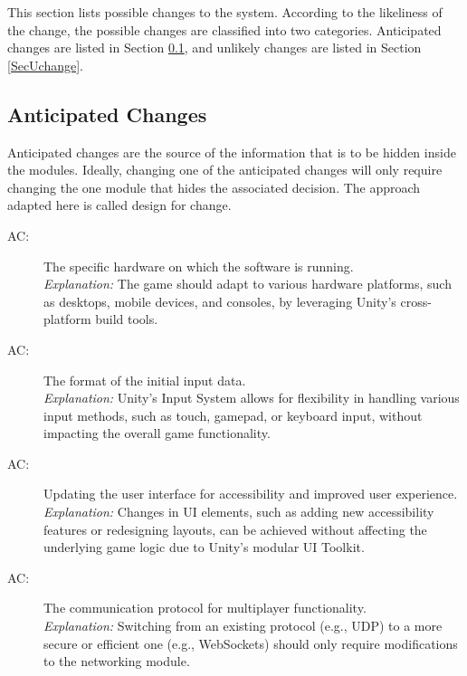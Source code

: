 \documentclass[12pt, titlepage]{article}
\newcounter{acnum}
\newcommand{\actheacnum}{AC\theacnum}
\begin{document}
This section lists possible changes to the system. According to the likeliness
of the change, the possible changes are classified into two
categories. Anticipated changes are listed in Section \ref{SecAchange}, and
unlikely changes are listed in Section \ref{SecUchange}.

\subsection{Anticipated Changes} \label{SecAchange}

Anticipated changes are the source of the information that is to be hidden
inside the modules. Ideally, changing one of the anticipated changes will only
require changing the one module that hides the associated decision. The approach
adapted here is called design for
change.

\begin{description}
\item[ \actheacnum \label{acHardware}:] The specific
  hardware on which the software is running. \\
  \textit{Explanation:} The game should adapt to various hardware platforms, such as desktops, mobile devices, and consoles, by leveraging Unity's cross-platform build tools.
  
\item[ \actheacnum \label{acInput}:] The format of the
  initial input data. \\
  \textit{Explanation:} Unity's Input System allows for flexibility in handling various input methods, such as touch, gamepad, or keyboard input, without impacting the overall game functionality.
  
\item[ \actheacnum \label{acUI}:] Updating the user interface for accessibility and improved user experience. \\
  \textit{Explanation:} Changes in UI elements, such as adding new accessibility features or redesigning layouts, can be achieved without affecting the underlying game logic due to Unity's modular UI Toolkit.

\item[ \actheacnum \label{acNetwork}:] The communication protocol for multiplayer functionality. \\
  \textit{Explanation:} Switching from an existing protocol (e.g., UDP) to a more secure or efficient one (e.g., WebSockets) should only require modifications to the networking module.
\end{description}
\end{document}
